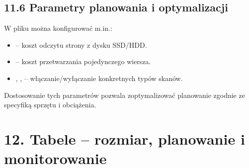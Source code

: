 \documentclass[a4paper,11pt,polish]{sphinxmanual}
\begin{document}
\sphinxAtStartPar
{}

\begin{sphinxVerbatim}[commandchars=\\\{\}]
        
    
\end{sphinxVerbatim}


\subsection{11.6 Parametry planowania i optymalizacji}
\label{\detokenize{Konfiguracja_baz_danych/Konfiguracja_baz_danych:parametry-planowania-i-optymalizacji}}
\sphinxAtStartPar
W pliku  można konfigurować m.in.:
\begin{itemize}
\item {} 
\sphinxAtStartPar
{} – koszt odczytu strony z dysku SSD/HDD.

\item {} 
\sphinxAtStartPar
{} – koszt przetwarzania pojedynczego wiersza.

\item {} 
\sphinxAtStartPar
{}, ,  – włączanie/wyłączanie konkretnych typów skanów.

\end{itemize}

\sphinxAtStartPar
Dostosowanie tych parametrów pozwala zoptymalizować planowanie zgodnie ze specyfiką sprzętu i obciążenia.


\section{12. Tabele – rozmiar, planowanie i monitorowanie}
\label{\detokenize{Konfiguracja_baz_danych/Konfiguracja_baz_danych:tabele-rozmiar-planowanie-i-monitorowanie}}
\end{document}
